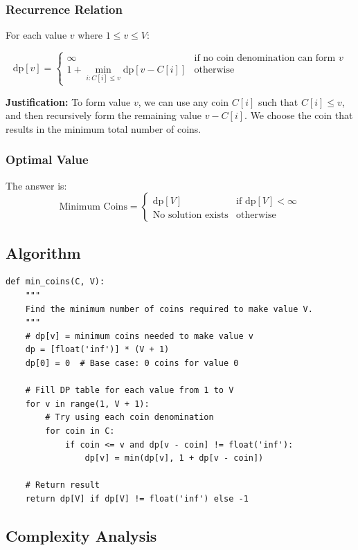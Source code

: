 \documentclass[12pt,a4paper]{article}
\begin{document}
\subsubsection*{Recurrence Relation}
For each value $v$ where $1 \le v \le V$:

\[
    \text{dp}[v] = \begin{cases}
        \infty & \text{if no coin denomination can form } v \\[6pt]
        1 + \min_{i: C[i] \le v} \text{dp}[v - C[i]] & \text{otherwise}
    \end{cases}
\]

\textbf{Justification:} To form value $v$, we can use any coin $C[i]$ such that $C[i] \le v$, and then recursively form the remaining value $v - C[i]$. We choose the coin that results in the minimum total number of coins.

\subsubsection*{Optimal Value}
The answer is:
\[
    \text{Minimum Coins} = \begin{cases}
        \text{dp}[V] & \text{if } \text{dp}[V] < \infty \\
        \text{No solution exists} & \text{otherwise}
    \end{cases}
\]

\subsection*{Algorithm}

\begin{verbatim}
def min_coins(C, V):
    """
    Find the minimum number of coins required to make value V.
    """
    # dp[v] = minimum coins needed to make value v
    dp = [float('inf')] * (V + 1)
    dp[0] = 0  # Base case: 0 coins for value 0

    # Fill DP table for each value from 1 to V
    for v in range(1, V + 1):
        # Try using each coin denomination
        for coin in C:
            if coin <= v and dp[v - coin] != float('inf'):
                dp[v] = min(dp[v], 1 + dp[v - coin])

    # Return result
    return dp[V] if dp[V] != float('inf') else -1
\end{verbatim}

\subsection*{Complexity Analysis}
\end{document}
